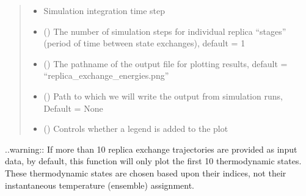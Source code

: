 \documentclass[letterpaper,12pt,english,openany,oneside]{sphinxmanual}
\begin{document}
\begin{fulllineitems}
\begin{quote}
\begin{description}
\begin{itemize}
\item {} 
 \textendash{} Simulation integration time step

\item {} 
 () \textendash{} The number of simulation steps for individual replica “stages” (period of time between state exchanges), default = 1

\item {} 
 () \textendash{} The pathname of the output file for plotting results, default = “replica\_exchange\_energies.png”

\item {} 
 () \textendash{} Path to which we will write the output from simulation runs, Default = None

\item {} 
 () \textendash{} Controls whether a legend is added to the plot

\end{itemize}

\end{description}\end{quote}

..warning:: If more than 10 replica exchange trajectories are provided as input data, by default, this function will only plot the first 10 thermodynamic states.  These thermodynamic states are chosen based upon their indices, not their instantaneous temperature (ensemble) assignment.

\end{fulllineitems}

\end{document}
